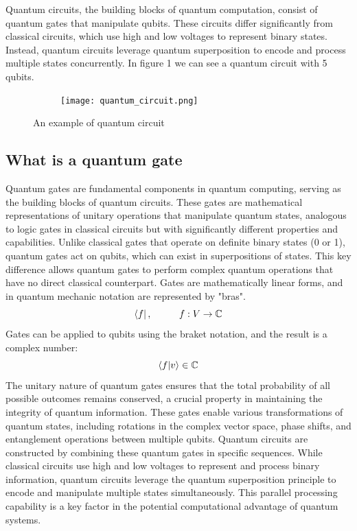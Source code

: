 \documentclass[12pt,oneside,a4paper]{article}
\begin{document}
Quantum circuits, the building blocks of quantum computation, consist of quantum gates that manipulate qubits. These circuits differ significantly from classical circuits, which use high and low voltages to represent binary states. Instead, quantum circuits leverage quantum superposition to encode and process multiple states concurrently. In figure 1 \cite{quantumcircuit} we can see a quantum circuit with 5 qubits.
\begin{figure}[h]
    \centering
    \begin{subfigure}[b]{0.7\textwidth}
    \texttt{[image: quantum\_circuit.png]}
    \end{subfigure}
    \caption{An example of quantum circuit}
\end{figure}

\subsection{What is a quantum gate}
Quantum gates are fundamental components in quantum computing, serving as the building blocks of quantum circuits. These gates are mathematical representations of unitary operations that manipulate quantum states, analogous to logic gates in classical circuits but with significantly different properties and capabilities.
Unlike classical gates that operate on definite binary states (0 or 1), quantum gates act on qubits, which can exist in superpositions of states. This key difference allows quantum gates to perform complex quantum operations that have no direct classical counterpart.
Gates are mathematically linear forms, and in quantum mechanic notation are represented by "bras". 
\begin{equation}
    \bra{f} , \hspace{10 mm} f: V \rightarrow \mathbb{C}
\end{equation}
Gates can be applied to qubits using the braket notation, and the result is a complex number:
\begin{equation}
    \braket{f|v} \in \mathbb{C}
\end{equation}
The unitary nature of quantum gates ensures that the total probability of all possible outcomes remains conserved, a crucial property in maintaining the integrity of quantum information. These gates enable various transformations of quantum states, including rotations in the complex vector space, phase shifts, and entanglement operations between multiple qubits.
Quantum circuits are constructed by combining these quantum gates in specific sequences. While classical circuits use high and low voltages to represent and process binary information, quantum circuits leverage the quantum superposition principle to encode and manipulate multiple states simultaneously. This parallel processing capability is a key factor in the potential computational advantage of quantum systems.
\end{document}
